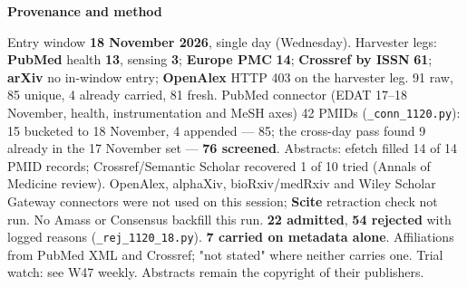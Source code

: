\documentclass[10pt]{article}
\begin{document}


\vspace{2mm}

\begin{keybox}
{\sffamily\bfseries\footnotesize\color{Deep}Provenance and method}\\[1.2mm]
{\fontsize{7.2}{8.8}\selectfont
Entry window \textbf{18 November 2026}, single day (Wednesday). Harvester legs: \textbf{PubMed} health \textbf{13}, sensing \textbf{3}; \textbf{Europe PMC} \textbf{14}; \textbf{Crossref by ISSN} \textbf{61}; \textbf{arXiv} no in-window entry; \textbf{OpenAlex} HTTP 403 on the harvester leg. 91 raw, 85 unique, 4 already carried, 81 fresh. PubMed connector (EDAT 17--18 November, health, instrumentation and MeSH axes) 42 PMIDs (\texttt{\_conn\_1120.py}): 15 bucketed to 18 November, 4 appended --- 85; the cross-day pass found 9 already in the 17 November set --- \textbf{76 screened}. Abstracts: efetch filled 14 of 14 PMID records; Crossref/Semantic Scholar recovered 1 of 10 tried (Annals of Medicine review).
OpenAlex, alphaXiv, bioRxiv/medRxiv and Wiley Scholar Gateway connectors were not used on this session; \textbf{Scite} retraction check not run. No Amass or Consensus backfill this run.
\textbf{22 admitted}, \textbf{54 rejected} with logged reasons (\texttt{\_rej\_1120\_18.py}). \textbf{7 carried on metadata alone}. Affiliations from PubMed XML and Crossref; "not stated" where neither carries one. Trial watch: see W47 weekly.
Abstracts remain the copyright of their publishers.\par}
\end{keybox}
\end{document}
